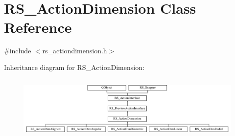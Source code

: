 \hypertarget{classRS__ActionDimension}{\section{R\-S\-\_\-\-Action\-Dimension Class Reference}
\label{classRS__ActionDimension}
}


{\ttfamily \#include $<$rs\-\_\-actiondimension.\-h$>$}

Inheritance diagram for R\-S\-\_\-\-Action\-Dimension\-:\begin{figure}[H]
\begin{center}
\leavevmode
\includegraphics[height=3.200000cm]{classRS__ActionDimension}
\end{center}
\end{figure}
